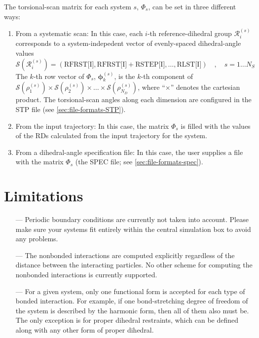 \documentclass[10pt,a4paper,openany]{memoir}
\numberwithin{equation}{section}
\begin{document}
The torsional-scan matrix for each system $s$, $\Phi_s$, can
be set in three different ways:
\begin{enumerate}
\item From a systematic scan: In this case, each $i$-th
  reference-dihedral group $\mathcal{R}_i^{(s)}$ corresponds to a
  system-indepedent vector of evenly-spaced dihedral-angle values
  $$\mathcal{S}(\mathcal{R}_i^{(s)})  = (\text{RFRST[I]}, \text{RFRST[I]} + \text{RSTEP[I]}, \ldots , \text{RLST[I]}) \quad , \quad s=1 \ldots N_S $$
  The $k$-th row vector of $\Phi_s$, $\boldsymbol{\phi}_k^{(s)}$, is
  the $k$-th component of
  $\mathcal{S}({\rho_1^{(s)}}) \times \mathcal{S}({\rho_2^{(s)}})
  \times \ldots \times \mathcal{S}(\rho_{N_D}^{(s)})$, where
  ``$\times$'' denotes the cartesian product.  The torsional-scan
  angles along each dimension are configured in the STP file (see
  \autoref{sec:file-formats-STP}).

\item From the input trajectory: In this case, the matrix $\Phi_s$ is
  filled with the values of the RDs calculated from the input
  trajectory for the system.
\item From a dihedral-angle specification file: In this case, the user
  supplies a file with the matrix $\Phi_s$ (the SPEC file; see
  \autoref{sec:file-formats-spec}).
\end{enumerate}


\section{Limitations}
\label{sec:limitations}

\begin{itemize}
\item[---] Periodic boundary conditions are currently not taken into
  account. Please make sure your systems fit entirely within the
  central simulation box to avoid any problems.
\item[---] The nonbonded interactions are computed explicitly
  regardless of the distance between the interacting particles. No
  other scheme for computing the nonbonded interactions is currently
  supported.
\item[---] For a given system, only one functional form is accepted
  for each type of bonded interaction. For example, if one
  bond-stretching degree of freedom of the system is described by the
  harmonic form, then all of them also must be. The only exception is
  for proper dihedral restraints, which can be defined along with any
  other form of proper dihedral.
\end{itemize}
\end{document}
